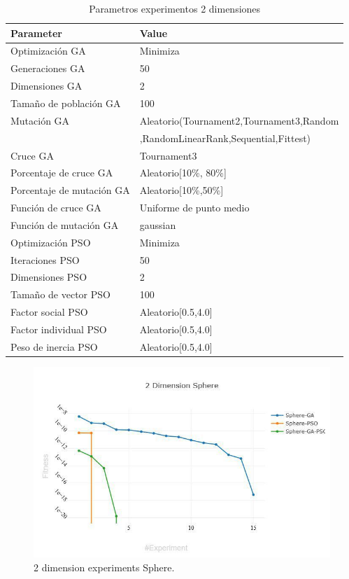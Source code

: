 \documentclass[runningheads]{llncs}
\begin{document}
   \begin{table}[htp]
    \caption{Parametros experimentos 2 dimensiones}
    \label{table:ga-pso-parameters-2}
    \centering
    \begin{tabular}{|l|l|}
    \hline
    Parameter & Value \\
    \hline
    \hline
    Optimizaci\'on GA & Minimiza \\
    \hline
    Generaciones GA & 50 \\
    \hline
    Dimensiones GA & 2 \\
    \hline
    Tama\~no de poblaci\'on GA & 100 \\
    \hline
    Mutaci\'on GA & Aleatorio(Tournament2,Tournament3,Random \\
    &  ,RandomLinearRank,Sequential,Fittest)\\
    \hline
    Cruce GA & Tournament3 \\
    \hline
    Porcentaje de cruce GA & Aleatorio[10\%, 80\%] \\
    \hline
    Porcentaje de mutaci\'on GA & Aleatorio[10\%,50\%] \\
    \hline
    Funci\'on de cruce GA & Uniforme de punto medio \\
    \hline
    Funci\'on de mutaci\'on GA & gaussian \\
    \hline
    Optimizaci\'on PSO & Minimiza \\
    \hline
    Iteraciones PSO & 50 \\
    \hline
    Dimensiones PSO & 2 \\
    \hline
    Tama\~no de vector PSO & 100 \\
    \hline
    Factor social PSO & Aleatorio[0.5,4.0] \\
    \hline
    Factor individual PSO & Aleatorio[0.5,4.0] \\
    \hline
    Peso de inercia PSO & Aleatorio[0.5,4.0] \\
    \hline
    \end{tabular}
    \end{table}

\begin{figure}[htp]
\includegraphics[width=\textwidth]{2-sphere.jpg}
\caption{2 dimension experiments Sphere.} \label{fig1}
\end{figure}
\end{document}
